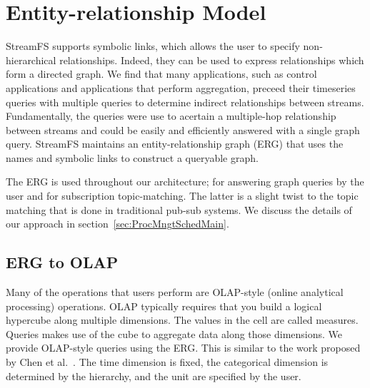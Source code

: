 


\section{Entity-relationship Model}

StreamFS supports symbolic links, which allows the user to specify non-hierarchical relationships.  Indeed, they can 
be used to express relationships which form a directed graph.  We find that many applications, such as control 
applications and applications that perform aggregation, preceed their timeseries queries with multiple queries
to determine indirect relationships between streams.  Fundamentally, the queries were use to acertain a multiple-hop
relationship between streams and could be easily and efficiently answered with a single graph query.
StreamFS maintains an entity-relationship graph (ERG) that uses the names and symbolic links to construct a queryable 
graph.

The ERG is used throughout our architecture; for answering graph queries by the user and for subscription topic-matching.
The latter is a slight twist to the topic matching that is done in traditional pub-sub systems.
We discuss the details of our approach in section~\ref{sec:ProcMngtSchedMain}.


\subsection{ERG to OLAP}
\label{sec:erg2olap}

Many of the operations that users perform are OLAP-style (online analytical processing) operations\cite{Gray1996}. 
OLAP typically requires that you build a logical hypercube along multiple dimensions.  The values in the cell are called 
measures.  Queries makes use of the cube to aggregate data along those dimensions.
We provide OLAP-style queries using the ERG.  This is similar to the work proposed by Chen et al.~\cite{Chen2008_olapgraph}.
The time dimension is fixed, the categorical dimension is determined by the hierarchy, and the unit are specified
by the user.

